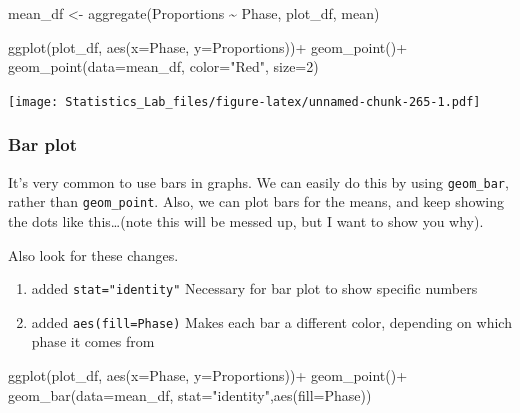 \documentclass[
]{book}
\newenvironment{Shaded}{\begin{snugshade}}{\end{snugshade}}
\newcommand{\AttributeTok}[1]{\textcolor[rgb]{0.77,0.63,0.00}{#1}}
\newcommand{\DecValTok}[1]{\textcolor[rgb]{0.00,0.00,0.81}{#1}}
\newcommand{\FunctionTok}[1]{\textcolor[rgb]{0.00,0.00,0.00}{#1}}
\newcommand{\NormalTok}[1]{#1}
\newcommand{\OtherTok}[1]{\textcolor[rgb]{0.56,0.35,0.01}{#1}}
\newcommand{\SpecialCharTok}[1]{\textcolor[rgb]{0.00,0.00,0.00}{#1}}
\newcommand{\StringTok}[1]{\textcolor[rgb]{0.31,0.60,0.02}{#1}}
\providecommand{\tightlist}{%
  \setlength{\itemsep}{0pt}\setlength{\parskip}{0pt}}
\begin{document}
\begin{Shaded}
\begin{Highlighting}[]
\NormalTok{mean\_df }\OtherTok{\textless{}{-}} \FunctionTok{aggregate}\NormalTok{(Proportions }\SpecialCharTok{\textasciitilde{}}\NormalTok{ Phase, plot\_df, mean)}

\FunctionTok{ggplot}\NormalTok{(plot\_df, }\FunctionTok{aes}\NormalTok{(}\AttributeTok{x=}\NormalTok{Phase, }\AttributeTok{y=}\NormalTok{Proportions))}\SpecialCharTok{+} 
  \FunctionTok{geom\_point}\NormalTok{()}\SpecialCharTok{+}
  \FunctionTok{geom\_point}\NormalTok{(}\AttributeTok{data=}\NormalTok{mean\_df, }\AttributeTok{color=}\StringTok{"Red"}\NormalTok{, }\AttributeTok{size=}\DecValTok{2}\NormalTok{)}
\end{Highlighting}
\end{Shaded}

\texttt{[image: Statistics\_Lab\_files/figure-latex/unnamed-chunk-265-1.pdf]}

\hypertarget{bar-plot}{%
\subsubsection{Bar plot}\label{bar-plot}}

It's very common to use bars in graphs. We can easily do this by using \texttt{geom\_bar}, rather than \texttt{geom\_point}. Also, we can plot bars for the means, and keep showing the dots like this\ldots(note this will be messed up, but I want to show you why).

Also look for these changes.

\begin{enumerate}
\def\labelenumi{\arabic{enumi}.}
\tightlist
\item
  added \texttt{stat="identity"} Necessary for bar plot to show specific numbers
\item
  added \texttt{aes(fill=Phase)} Makes each bar a different color, depending on which phase it comes from
\end{enumerate}

\begin{Shaded}
\begin{Highlighting}[]
\FunctionTok{ggplot}\NormalTok{(plot\_df, }\FunctionTok{aes}\NormalTok{(}\AttributeTok{x=}\NormalTok{Phase, }\AttributeTok{y=}\NormalTok{Proportions))}\SpecialCharTok{+} 
  \FunctionTok{geom\_point}\NormalTok{()}\SpecialCharTok{+}
  \FunctionTok{geom\_bar}\NormalTok{(}\AttributeTok{data=}\NormalTok{mean\_df, }\AttributeTok{stat=}\StringTok{"identity"}\NormalTok{,}\FunctionTok{aes}\NormalTok{(}\AttributeTok{fill=}\NormalTok{Phase))}
\end{Highlighting}
\end{Shaded}
\end{document}
